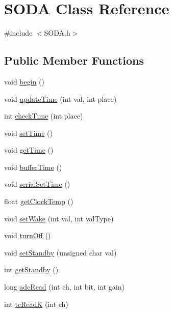 \hypertarget{class_s_o_d_a}{\section{S\-O\-D\-A Class Reference}
\label{class_s_o_d_a}
}


{\ttfamily \#include $<$S\-O\-D\-A.\-h$>$}

\subsection*{Public Member Functions}
\begin{DoxyCompactItemize}
\item 
void \hyperlink{class_s_o_d_a_a95ec5e2456f6402478c101dad0b735ce}{begin} ()
\item 
void \hyperlink{class_s_o_d_a_a17bd73a287665e022f8e955db65618b8}{update\-Time} (int val, int place)
\item 
int \hyperlink{class_s_o_d_a_a9cca81f7fda16982cc1eb4030774425b}{check\-Time} (int place)
\item 
void \hyperlink{class_s_o_d_a_a69b626b4dfd0847a1d9452ce8faba28e}{set\-Time} ()
\item 
void \hyperlink{class_s_o_d_a_a126e337a85ae2ff4380d738d8d55ed64}{get\-Time} ()
\item 
void \hyperlink{class_s_o_d_a_a93c1adcc876e1681db69d992153ffb28}{buffer\-Time} ()
\item 
void \hyperlink{class_s_o_d_a_abac684bb54a9d346337b6e0ed9243e40}{serial\-Set\-Time} ()
\item 
float \hyperlink{class_s_o_d_a_abce8c3a638c71d842ab79af3120138c5}{get\-Clock\-Temp} ()
\item 
void \hyperlink{class_s_o_d_a_a6acf21ab1e6db2b8861715e8a5a7f37f}{set\-Wake} (int val, int val\-Type)
\item 
void \hyperlink{class_s_o_d_a_a135382c3d907496f74c852965b31ffdd}{turn\-Off} ()
\item 
void \hyperlink{class_s_o_d_a_aa78eec946be2a371ae844fa44f6e4d96}{set\-Standby} (unsigned char val)
\item 
int \hyperlink{class_s_o_d_a_a98719fd95cb6fd3c70f221e62dbf06f4}{get\-Standby} ()
\item 
long \hyperlink{class_s_o_d_a_a30b86308dcb295c5e86b79049d3bafdd}{adc\-Read} (int ch, int bit, int gain)
\item 
int \hyperlink{class_s_o_d_a_a1f1aa095370775ed2d94ca6d842ff213}{tc\-Read\-K} (int ch)
\item 

\end{DoxyCompactItemize}
